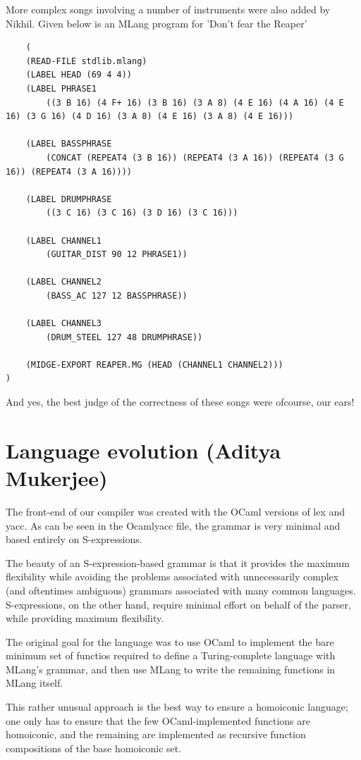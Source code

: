 \documentclass[letterpaper,11pt]{article}
\begin{document}
{\begin{lstlisting}
\end{lstlisting}
More complex songs involving a number of instruments were also added by Nikhil. Given below is an MLang program for 'Don't fear the Reaper'

\lstset{language=Lisp}
\begin{lstlisting}
	(
	(READ-FILE stdlib.mlang)
	(LABEL HEAD (69 4 4))
	(LABEL PHRASE1
		((3 B 16) (4 F+ 16) (3 B 16) (3 A 8) (4 E 16) (4 A 16) (4 E 16) (3 G 16) (4 D 16) (3 A 8) (4 E 16) (3 A 8) (4 E 16)))

	(LABEL BASSPHRASE
		(CONCAT (REPEAT4 (3 B 16)) (REPEAT4 (3 A 16)) (REPEAT4 (3 G 16)) (REPEAT4 (3 A 16))))

	(LABEL DRUMPHRASE
		((3 C 16) (3 C 16) (3 D 16) (3 C 16)))

	(LABEL CHANNEL1
		(GUITAR_DIST 90 12 PHRASE1))

	(LABEL CHANNEL2
		(BASS_AC 127 12 BASSPHRASE))

	(LABEL CHANNEL3
		(DRUM_STEEL 127 48 DRUMPHRASE))

	(MIDGE-EXPORT REAPER.MG (HEAD (CHANNEL1 CHANNEL2)))
)
\end{lstlisting}

And yes, the best judge of the correctness of these songs were ofcourse, our ears!


\section{Language evolution (Aditya Mukerjee)}

The front-end of our compiler was created with the OCaml versions of lex and yacc. As can be seen in the Ocamlyacc file, the grammar is very minimal and based entirely on S-expressions.

The beauty of an S-expression-based grammar is that it provides the maximum flexibility while avoiding the problems associated with unnecessarily complex (and oftentimes ambiguous) grammars associated with many common languages. S-expressions, on the other hand, require minimal effort on behalf of the parser, while providing maximum flexibility.

The original goal for the language was to use OCaml to implement the bare minimum set of functios required to define a Turing-complete language with MLang's grammar, and then use MLang to write the remaining functions in MLang itself.

This rather unusual approach is the best way to ensure a homoiconic language; one only has to ensure that the few OCaml-implemented functions are homoiconic, and the remaining are implemented as recursive function compositions of the base homoiconic set. 

}
\end{document}
